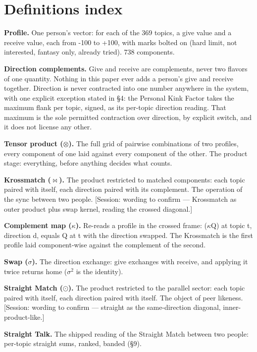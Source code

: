 \section{Definitions index}\label{definitions-index}

\textbf{Profile.} One person's vector: for each of the 369 topics, a
give value and a receive value, each from -100 to +100, with marks
bolted on (hard limit, not interested, fantasy only, already tried). 738
components.

\textbf{Direction complements.} Give and receive are complements, never
two flavors of one quantity. Nothing in this paper ever adds a person's
give and receive together. Direction is never contracted into one number
anywhere in the system, with one explicit exception stated in \S 4: the
Personal Kink Factor takes the maximum flank per topic, signed, as its
per-topic direction reading. That maximum is the sole permitted
contraction over direction, by explicit switch, and it does not license
any other.

\textbf{Tensor product ($\otimes$).} The full grid of pairwise combinations of
two profiles, every component of one laid against every component of the
other. The product stage: everything, before anything decides what
counts.

\textbf{Krossmatch ($\bowtie$).} The product restricted to matched components:
each topic paired with itself, each direction paired with its
complement. The operation of the sync between two people. {[}Session:
wording to confirm --- Krossmatch as outer product plus swap kernel,
reading the crossed diagonal.{]}

\textbf{Complement map ($\kappa$).} Re-reads a profile in the crossed frame:
($\kappa$Q) at topic t, direction d, equals Q at t with the direction swapped.
The Krossmatch is the first profile laid component-wise against the
complement of the second.

\textbf{Swap ($\sigma$).} The direction exchange: give exchanges with receive,
and applying it twice returns home ($\sigma^2$ is the identity).

\textbf{Straight Match ($\odot$).} The product restricted to the parallel
sector: each topic paired with itself, each direction paired with
itself. The object of peer likeness. {[}Session: wording to confirm ---
straight as the same-direction diagonal, inner-product-like.{]}

\textbf{Straight Talk.} The shipped reading of the Straight Match
between two people: per-topic straight sums, ranked, banded (\S 9).

